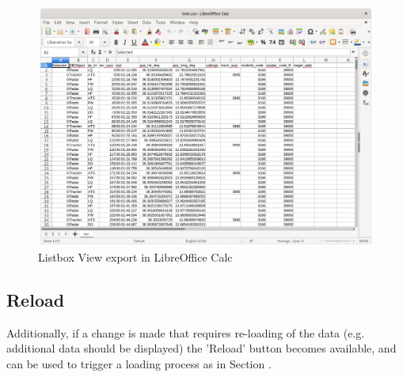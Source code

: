 \begin{figure}[H]
    \hspace*{-2.5cm}
    \includegraphics[width=19cm]{figures/listbox_exported_calc.png}
  \caption{Listbox View export in LibreOffice Calc}
\end{figure}
 
\subsection{Reload}

Additionally, if a change is made that requires re-loading of the data (e.g. additional data should be displayed) the 'Reload' button becomes available, and can be used to trigger a loading process as in Section . 
